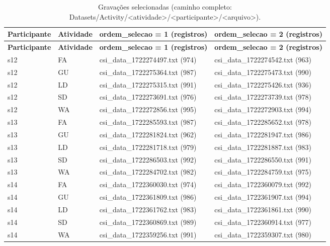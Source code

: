 {\footnotesize
\begin{longtable}{|>{\centering\arraybackslash}p{1.88cm}|>{\centering\arraybackslash}p{1.71cm}|>{\centering\arraybackslash}p{5.30cm}|>{\centering\arraybackslash}p{5.30cm}|}
\caption{Gravações selecionadas (caminho completo: Datasets/Activity/\textless{}atividade\textgreater{}/\textless{}participante\textgreater{}/\textless{}arquivo\textgreater{}).}\\
\hline
\textbf{Participante} & \textbf{Atividade} & \textbf{ordem\_selecao = 1 (registros)} & \textbf{ordem\_selecao = 2 (registros)} \\ \hline
\endfirsthead
\hline
\textbf{Participante} & \textbf{Atividade} & \textbf{ordem\_selecao = 1 (registros)} & \textbf{ordem\_selecao = 2 (registros)} \\ \hline
\endhead
s12 & FA & csi\_data\_1722274497.txt (974) & csi\_data\_1722274542.txt (963) \\ \hline
s12 & GU & csi\_data\_1722275364.txt (987) & csi\_data\_1722275473.txt (990) \\ \hline
s12 & LD & csi\_data\_1722275315.txt (991) & csi\_data\_1722275426.txt (936) \\ \hline
s12 & SD & csi\_data\_1722273691.txt (976) & csi\_data\_1722273739.txt (978) \\ \hline
s12 & WA & csi\_data\_1722272856.txt (995) & csi\_data\_1722272903.txt (994) \\ \hline
s13 & FA & csi\_data\_1722285593.txt (987) & csi\_data\_1722285652.txt (978) \\ \hline
s13 & GU & csi\_data\_1722281824.txt (962) & csi\_data\_1722281947.txt (986) \\ \hline
s13 & LD & csi\_data\_1722281718.txt (979) & csi\_data\_1722281887.txt (983) \\ \hline
s13 & SD & csi\_data\_1722286503.txt (992) & csi\_data\_1722286550.txt (991) \\ \hline
s13 & WA & csi\_data\_1722284702.txt (982) & csi\_data\_1722284759.txt (975) \\ \hline
s14 & FA & csi\_data\_1722360030.txt (974) & csi\_data\_1722360079.txt (992) \\ \hline
s14 & GU & csi\_data\_1722361809.txt (986) & csi\_data\_1722361907.txt (994) \\ \hline
s14 & LD & csi\_data\_1722361762.txt (983) & csi\_data\_1722361861.txt (990) \\ \hline
s14 & SD & csi\_data\_1722360869.txt (989) & csi\_data\_1722360914.txt (977) \\ \hline
s14 & WA & csi\_data\_1722359256.txt (991) & csi\_data\_1722359307.txt (980) \\ \hline
\end{longtable}
}

\newpage

